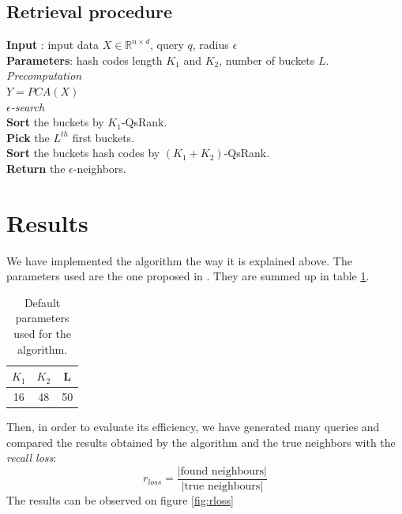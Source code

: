 \documentclass{article}
\newcommand{\RR}{\mathbb{R}}
\begin{document}
\subsection{Retrieval procedure}

\begin{algorithm}[H]

\textbf{Input} : input data $X \in \RR^{n \times d}$, query $q$, radius $\epsilon$\\
\textbf{Parameters}: hash codes length $K_1$ and $K_2$, number of buckets $L$.\\
\textit{Precomputation}\\
$Y = PCA(X)$\\
\textit{$\epsilon$-search}\\
\textbf{Sort} the buckets by $K_1$-QsRank.\\
\textbf{Pick} the $L^{th}$ first buckets.\\
\textbf{Sort} the buckets hash codes by $(K_1+K_2)$-QsRank.\\
\textbf{Return} the $\epsilon$-neighbors.
\end{algorithm}

\newpage

\section{Results}

We have implemented the algorithm the way it is explained above. The parameters used are the one proposed in \citep{QSRank}. They are summed up in table \ref{params}.
\begin{table}[htbp]
\begin{center}
  \begin{tabular}{|c|c|c|}
		\hline
		$K_1$ & $K_2$ & L \\
		\hline
		16 & 48 & 50\\
		\hline
\end{tabular}
\caption{Default parameters used for the algorithm.}
\end{center}
\label{params}
\end{table}

Then, in order to evaluate its efficiency, we have generated many queries and compared the results obtained by the algorithm and the true neighbors with the \textit{recall loss}:
\[
	r_{loss} = \frac{|\text{found neighbours}|}{|\text{true neighbours}|}
\]
The results can be observed on figure \ref{fig:rloss}
\end{document}
